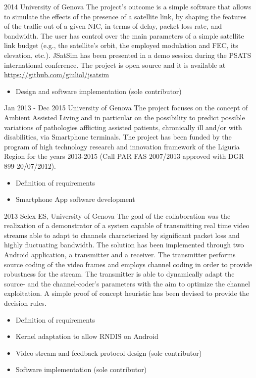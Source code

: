 {2014}
{University of Genova}
{The project's outcome is a simple software that allows to simulate the effects of the presence of a satellite link, by shaping the features of the traffic out of a given NIC, in terms of delay, packet loss rate, and bandwidth.
The user has control over the main parameters of a simple satellite link budget (e.g., the satellite's orbit, the employed modulation and FEC, its elevation, etc.).
JSatSim has been presented in a demo session during the PSATS international conference.
The project is open source and it is available at \url{https://github.com/giuliol/jsatsim}
}
{
\begin{itemize}[noitemsep,topsep=0pt,parsep=0pt,partopsep=0pt]
\item Design and software implementation  (sole contributor)
\end{itemize}
}

{Jan 2013 - Dec 2015}
{University of Genova}
{The project focuses on the concept of Ambient Assisted Living and in particular on the possibility to predict possible variations of pathologies afflicting assisted patients, chronically ill and/or with disabilities, via Smartphone terminals. The project has been funded by the program of high technology research and innovation framework of the Liguria Region for the years 2013-2015 (Call PAR FAS 2007/2013 approved with DGR 899 20/07/2012).}
{
\begin{itemize}[noitemsep,topsep=0pt,parsep=0pt,partopsep=0pt]
\item Definition of requirements
\item Smartphone App software development
\end{itemize}
} 

{2013}
{Selex ES, University of Genova}
{The goal of the collaboration was the realization of a demonstrator of a system capable of transmitting real time video streams able to adapt to  channels characterized by significant packet loss and highly fluctuating bandwidth. The solution has been implemented through two Android application, a transmitter and a receiver. The transmitter performs source coding of the video frames and employs channel coding in order to provide robustness for the stream. 
The transmitter is able to dynamically adapt the source- and the channel-coder's parameters with the aim to optimize the channel exploitation.
A simple proof of concept heuristic has been devised to provide the decision rules.}
{
\begin{itemize}[noitemsep,topsep=0pt,parsep=0pt,partopsep=0pt]
\item Definition of requirements
\item Kernel adaptation to allow RNDIS on Android
\item Video stream and feedback protocol design (sole contributor)
\item Software implementation (sole contributor)
\end{itemize}
} 

